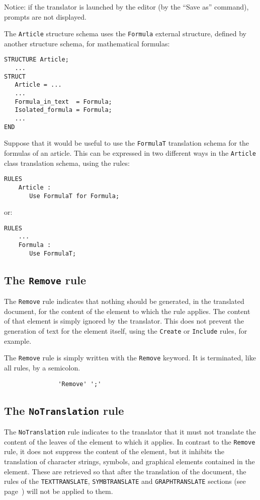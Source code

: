 Notice: if the translator is launched by the editor (by the ``Save as''
command), prompts are not displayed.

\begin{example}
The {\tt Article} structure schema uses the {\tt Formula} external
structure, defined by another structure schema, for mathematical formulas:
\begin{verbatim}
STRUCTURE Article;
   ...
STRUCT
   Article = ...
   ...
   Formula_in_text  = Formula;
   Isolated_formula = Formula;
   ...
END
\end{verbatim}
Suppose that it would be useful to use the {\tt FormulaT} translation
schema for the formulas of an article.  This can be expressed in two
different ways in the {\tt Article} class translation schema, using
the rules:
\begin{verbatim}
RULES
    Article :
       Use FormulaT for Formula;
\end{verbatim}
or:
\begin{verbatim}
RULES
    ...
    Formula :
       Use FormulaT;
\end{verbatim}
\end{example}

\subsection{The {\tt Remove} rule}
\label{remove}

The {\tt Remove} rule indicates that nothing should be generated, in
the translated document, for the content of the element to which the
rule applies.  The content of that element is simply ignored by the
translator.  This does not prevent the generation of text for the
element itself, using the {\tt Create} or {\tt Include} rules, for
example.

The {\tt Remove} rule is simply written with the {\tt Remove} keyword.
It is terminated, like all rules, by a semicolon.

\begin{verbatim}
               'Remove' ';'
\end{verbatim}

\subsection{The {\tt NoTranslation} rule}
\label{notrans}

The {\tt NoTranslation} rule indicates to the translator that it must
not translate the content of the leaves of the element to which it
applies.  In contrast to the {\tt Remove} rule, it does not suppress
the content of the element, but it inhibits the translation of
character strings, symbols, and graphical elements contained in the
element.  These are retrieved so that after the translation of the
document, the rules of the {\tt TEXTTRANSLATE}, {\tt SYMBTRANSLATE}
and {\tt GRAPHTRANSLATE} sections (see page~\pageref{texttrans}) will
not be applied to them.


